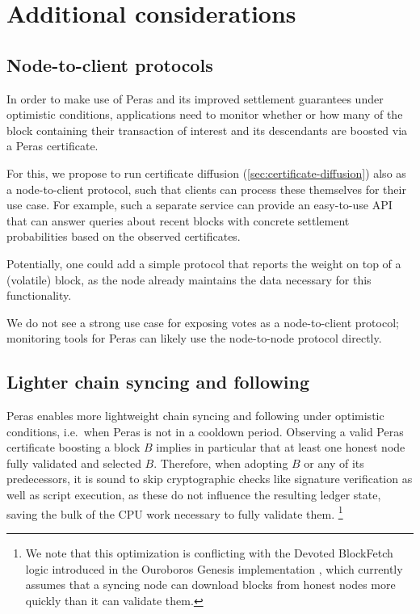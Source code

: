 \section{Additional considerations}

\subsection{Node-to-client protocols}

In order to make use of Peras and its improved settlement guarantees under optimistic conditions, applications need to monitor whether or how many of the block containing their transaction of interest and its descendants are boosted via a Peras certificate.

For this, we propose to run certificate diffusion (\cref{sec:certificate-diffusion}) also as a node-to-client protocol, such that clients can process these themselves for their use case.
For example, such a separate service can provide an easy-to-use API that can answer queries about recent blocks with concrete settlement probabilities based on the observed certificates.

Potentially, one could add a simple protocol that reports the weight on top of a (volatile) block, as the node already maintains the data necessary for this functionality.

We do not see a strong use case for exposing votes as a node-to-client protocol; monitoring tools for Peras can likely use the node-to-node protocol directly.

\subsection{Lighter chain syncing and following}

Peras enables more lightweight chain syncing and following under optimistic conditions, i.e.\ when Peras is not in a cooldown period.
Observing a valid Peras certificate boosting a block $B$ implies in particular that at least one honest node fully validated and selected $B$.
Therefore, when adopting $B$ or any of its predecessors, it is sound to skip cryptographic checks like signature verification as well as script execution, as these do not influence the resulting ledger state, saving the bulk of the CPU work necessary to fully validate them.%
\footnote{We note that this optimization is conflicting with the Devoted BlockFetch logic introduced in the Ouroboros Genesis implementation \parencite{genesis-implementation-documentation}, which currently assumes that a syncing node can download blocks from honest nodes more quickly than it can validate them.}

